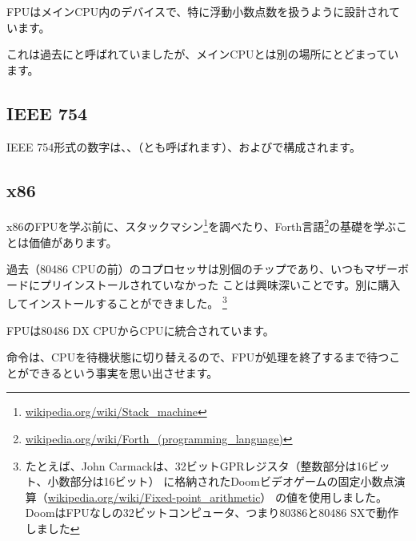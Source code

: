 ﻿\mysection{\FPUChapterName}
\label{sec:FPU}

\newcommand{\FNURLSTACK}{\footnote{\href{http://go.yurichev.com/17123}{wikipedia.org/wiki/Stack\_machine}}}
\newcommand{\FNURLFORTH}{\footnote{\href{http://go.yurichev.com/17124}{wikipedia.org/wiki/Forth\_(programming\_language)}}}
\newcommand{\FNURLIEEE}{\footnote{\href{http://go.yurichev.com/17125}{wikipedia.org/wiki/IEEE\_floating\_point}}}
\newcommand{\FNURLSP}{\footnote{\href{http://go.yurichev.com/17126}{wikipedia.org/wiki/Single-precision\_floating-point\_format}}}
\newcommand{\FNURLDP}{\footnote{\href{http://go.yurichev.com/17127}{wikipedia.org/wiki/Double-precision\_floating-point\_format}}}
\newcommand{\FNURLEP}{\footnote{\href{http://go.yurichev.com/17128}{wikipedia.org/wiki/Extended\_precision}}}

\ac{FPU}はメイン\ac{CPU}内のデバイスで、特に浮動小数点数を扱うように設計されています。

これは過去にと呼ばれていましたが、メイン\ac{CPU}とは別の場所にとどまっています。

\subsection{IEEE 754}

IEEE 754形式の数字は、、（とも呼ばれます）、およびで構成されます。

\subsection{x86}

x86の\ac{FPU}を学ぶ前に、スタックマシン\FNURLSTACK を調べたり、Forth言語\FNURLFORTH の基礎を学ぶことは価値があります。

過去（80486 CPUの前）のコプロセッサは別個のチップであり、いつもマザーボードにプリインストールされていなかった
ことは興味深いことです。別に購入してインストールすることができました。
\footnote{たとえば、John Carmackは、32ビット\ac{GPR}レジスタ（整数部分は16ビット、小数部分は16ビット）
に格納されたDoomビデオゲームの固定小数点演算（\href{http://go.yurichev.com/17356}{wikipedia.org/wiki/Fixed-point\_arithmetic}）
の値を使用しました。 DoomはFPUなしの32ビットコンピュータ、つまり80386と80486 SXで動作しました}

\ac{FPU}は80486 DX CPUから\ac{CPU}に統合されています。

命令は、\ac{CPU}を待機状態に切り替えるので、\ac{FPU}が処理を終了するまで待つことができるという事実を思い出させます。

